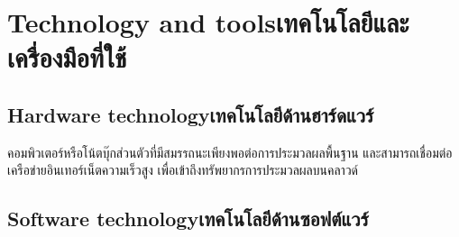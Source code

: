 \section{\ifenglish Technology and tools\else เทคโนโลยีและเครื่องมือที่ใช้\fi}
\subsection{\ifenglish Hardware technology\else เทคโนโลยีด้านฮาร์ดแวร์\fi}
คอมพิวเตอร์หรือโน้ตบุ๊กส่วนตัวที่มีสมรรถนะเพียงพอต่อการประมวลผลพื้นฐาน และสามารถเชื่อมต่อเครือข่ายอินเทอร์เน็ตความเร็วสูง เพื่อเข้าถึงทรัพยากรการประมวลผลบนคลาวด์

\subsection{\ifenglish Software technology\else เทคโนโลยีด้านซอฟต์แวร์\fi}
